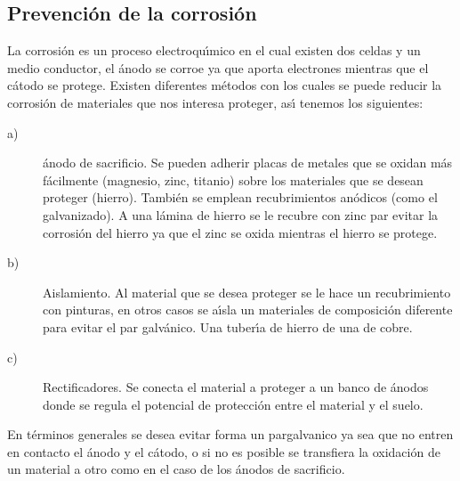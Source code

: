 \subsection{Prevenci\'on de la corrosi\'on}

La corrosi\'on  es un proceso
electroqu\'{\i}mico en el cual existen dos celdas y un medio conductor, el \'anodo se
corroe ya que aporta electrones mientras que el c\'atodo se protege.
Existen diferentes m\'etodos con los cuales se puede reducir la corrosi\'on de materiales
que nos interesa proteger, as\'{\i} tenemos los siguientes:

\begin{description}
\item[a)]\'anodo de sacrificio. Se pueden adherir placas de metales que se o\-xidan m\'as f\'acilmente (magnesio, zinc, titanio) sobre los materiales que se desean proteger (hierro). Tambi\'en se emplean recubrimientos an\'odicos  (como el galvanizado). A una l\'amina de hierro se le recubre con zinc par evitar la corrosi\'on del hierro ya que el zinc se oxida mientras el hierro se protege.
\item[b)]Aislamiento. Al material que se desea proteger se le hace un recubri\-miento con pinturas, en otros casos se a\'{\i}sla un materiales de composici\'on  diferente para evitar el par galv\'anico. Una tuber\'{\i}a de hierro de una de cobre.
\item[c)] Rectificadores. Se conecta el material a proteger a un banco de \'anodos donde se regula el potencial de protecci\'on entre el material y el suelo.
\end{description}
En t\'erminos generales se desea evitar forma un \gls{pargalvanico}  ya sea que no entren en contacto el \'anodo y el c\'atodo, o si no es posible se transfiera la oxidaci\'on de un material a otro como en el caso de los \'anodos de sacrificio.